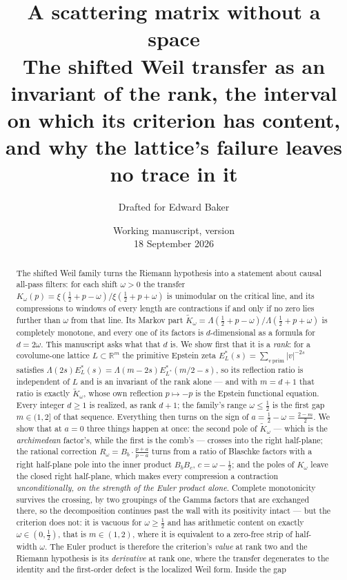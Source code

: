 \documentclass[11pt]{article}
\title{A scattering matrix without a space\\[5pt]
\large The shifted Weil transfer as an invariant of the rank, the interval on
which its criterion has content, and why the lattice's failure leaves no trace
in it}
\author{Drafted for Edward Baker}
\date{Working manuscript, version \draftversion\\18 September 2026}
\numberwithin{equation}{section}
\theoremstyle{definition}
\theoremstyle{remark}
\newcommand{\R}{\mathbb R}
\newcommand{\Kt}{\widetilde K}
\newcommand{\Est}{E^{*}}
\begin{document}
\maketitle
\begin{abstract}
The shifted Weil family turns the Riemann hypothesis into a statement about
causal all-pass filters: for each shift $\omega>0$ the transfer
$K_\omega(p)=\xi(\frac12+p-\omega)/\xi(\frac12+p+\omega)$ is unimodular on the
critical line, and its compressions to windows of every length are contractions
if and only if no zero lies further than $\omega$ from that line. Its Markov
part $\Kt_\omega=\Lambda(\frac12+p-\omega)/\Lambda(\frac12+p+\omega)$ is
completely monotone, and every one of its factors is $d$-dimensional as a
formula for $d=2\omega$. This manuscript asks what that $d$ is. We show first
that it is a \emph{rank}: for a covolume-one lattice $L\subset\R^{m}$ the
primitive Epstein zeta $\Est_L(s)=\sum_{v\ \mathrm{prim}}\lvert v\rvert^{-2s}$
satisfies $\Lambda(2s)\Est_L(s)=\Lambda(m-2s)\Est_{L^{*}}(m/2-s)$, so its
reflection ratio is independent of $L$ and is an invariant of the rank alone ---
and with $m=d+1$ that ratio is exactly $\Kt_\omega$, whose own reflection
$p\mapsto-p$ is the Epstein functional equation. Every integer $d\ge1$ is
realized, as rank $d+1$; the family's range $\omega\le\frac12$ is the first gap
$m\in(1,2]$ of that sequence. Everything then turns on the sign of
$a=\frac12-\omega=\frac{2-m}2$. We show that at $a=0$ three things happen at
once: the second pole of $\Kt_\omega$ --- which is the \emph{archimedean}
factor's, while the first is the comb's --- crosses into the right half-plane;
the rational correction $R_\omega=B_b\cdot\frac{p+a}{p-a}$ turns from a ratio of
Blaschke factors with a right half-plane pole into the inner product $B_bB_c$,
$c=\omega-\frac12$; and the poles of $K_\omega$ leave the closed right
half-plane, which makes every compression a contraction \emph{unconditionally,
on the strength of the Euler product alone}. Complete monotonicity survives the
crossing, by two groupings of the Gamma factors that are exchanged there, so the
decomposition continues past the wall with its positivity intact --- but the
criterion does not: it is vacuous for $\omega\ge\frac12$ and has arithmetic
content on exactly $\omega\in(0,\frac12)$, that is $m\in(1,2)$, where it is
equivalent to a zero-free strip of half-width $\omega$. The Euler product is
therefore the criterion's \emph{value} at rank two and the Riemann hypothesis is
its \emph{derivative} at rank one, where the transfer degenerates to the
identity and the first-order defect is the localized Weil form. Inside the gap

\end{abstract}
\end{document}
